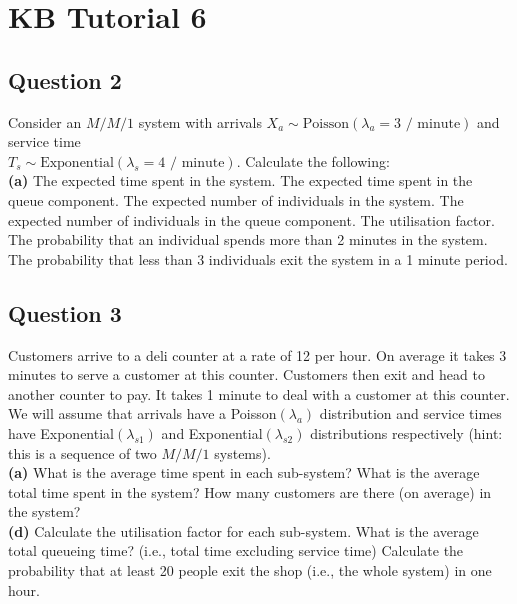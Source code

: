 
\newpage
\section{KB Tutorial 6}


\subsection*{Question 2}
Consider an $M/M/1$ system with arrivals $X_a \sim \text{Poisson}(\lambda_a=3 \text{ / minute})$ and service time \\$T_s \sim \text{Exponential}(\lambda_s=4 \text{ / minute})$. Calculate the following:\\[-0.2cm]

{\bf(a)} The expected time spent in the system.  The expected time spent in the queue component.  The expected number of individuals in the system.   The expected number of individuals in the queue component.  The utilisation factor.  The probability that an individual spends more than 2 minutes in the system.  The probability that less than 3 individuals exit the system in a 1 minute period.





\subsection*{Question 3}
Customers arrive to a deli counter at a rate of 12 per hour. On average it takes 3 minutes to serve a customer at this counter. Customers then exit and head to another counter to pay. It takes 1 minute to deal with a customer at this counter. We will assume that arrivals have a Poisson$(\lambda_a)$ distribution and service times have Exponential$(\lambda_{s1})$ and Exponential$(\lambda_{s2})$ distributions respectively (hint: this is a sequence of two $M/M/1$ systems).\\[-0.2cm]

{\bf(a)} What is the average time spent in each sub-system?  What is the average total time spent in the system?  How many customers are there (on average) in the system?  \quad \\{\bf(d)} Calculate the utilisation factor for each sub-system.  What is the average total queueing time? (i.e., total time excluding service time)  Calculate the probability that at least 20 people exit the shop (i.e., the whole system) in one hour.



